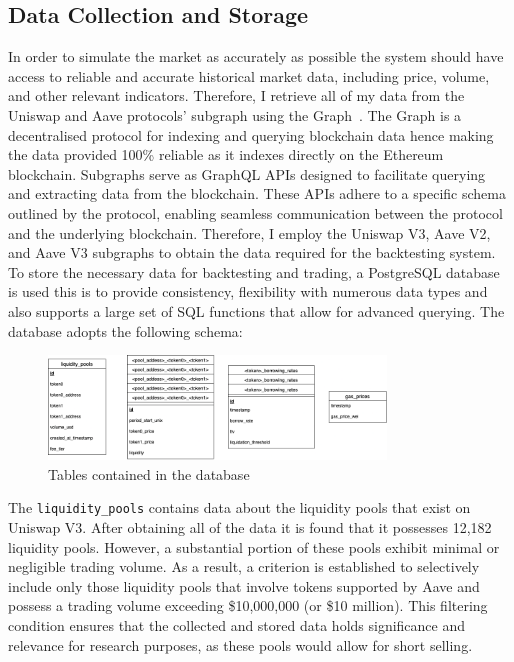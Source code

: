 \subsection{Data Collection and Storage}
In order to simulate the market as accurately as possible the system should have access to reliable and accurate historical market data, including price, volume, and other relevant indicators. Therefore, I retrieve all of my data from the Uniswap and Aave protocols' subgraph using the Graph~\cite{noauthor_graph_nodate}. The Graph is a decentralised protocol for indexing and querying blockchain data hence making the data provided 100\% reliable as it indexes directly on the Ethereum blockchain. Subgraphs serve as GraphQL APIs designed to facilitate querying and extracting data from the blockchain. These APIs adhere to a specific schema outlined by the protocol, enabling seamless communication between the protocol and the underlying blockchain. Therefore, I employ the Uniswap V3, Aave V2, and Aave V3 subgraphs to obtain the data required for the backtesting system.
\\[3mm]
To store the necessary data for backtesting and trading, a PostgreSQL database is used this is to provide consistency, flexibility with numerous data types and also supports a large set of SQL functions that allow for advanced querying. The database adopts the following schema:
\begin{figure}[!htb]
    \centering
    \includegraphics[width=0.8\textwidth]{project/Images/database_tables.png}
    \caption{Tables contained in the database \label{fig:database}}
\end{figure}
The \texttt{liquidity\_pools} contains data about the liquidity pools that exist on Uniswap V3. After obtaining all of the data it is found that it possesses 12,182 liquidity pools. However, a substantial portion of these pools exhibit minimal or negligible trading volume. As a result, a criterion is established to selectively include only those liquidity pools that involve tokens supported by Aave and possess a trading volume exceeding \$10,000,000 (or \$10 million). This filtering condition ensures that the collected and stored data holds significance and relevance for research purposes, as these pools would allow for short selling.
